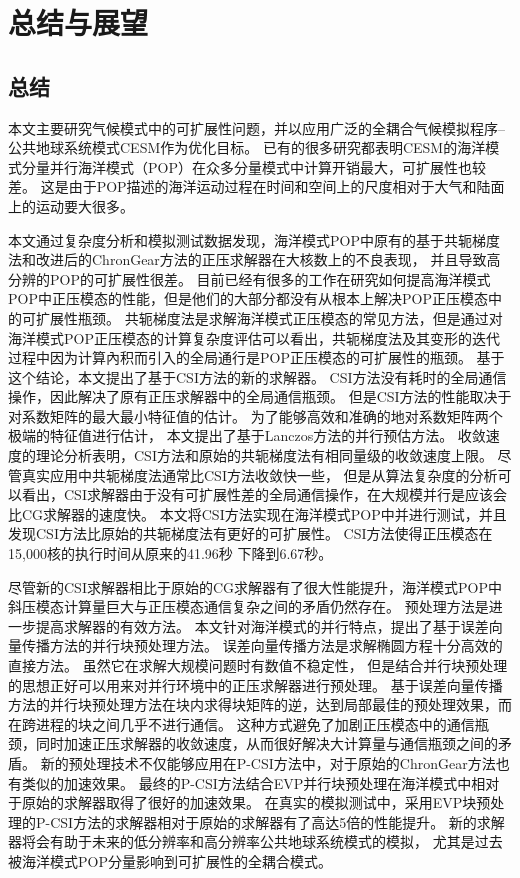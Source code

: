 \chapter{总结与展望}
\label{cha:conclusion}

\section{总结}
\label{sec:conclude}


本文主要研究气候模式中的可扩展性问题，并以应用广泛的全耦合气候模拟程序--公共地球系统模式CESM作为优化目标。
已有的很多研究都表明CESM的海洋模式分量并行海洋模式（POP）在众多分量模式中计算开销最大，可扩展性也较差。 
这是由于POP描述的海洋运动过程在时间和空间上的尺度相对于大气和陆面上的运动要大很多。  


本文通过复杂度分析和模拟测试数据发现，海洋模式POP中原有的基于共轭梯度法和改进后的ChronGear方法的正压求解器在大核数上的不良表现，
并且导致高分辨的POP的可扩展性很差。
目前已经有很多的工作在研究如何提高海洋模式POP中正压模态的性能，但是他们的大部分都没有从根本上解决POP正压模态中的可扩展性瓶颈。 
共轭梯度法是求解海洋模式正压模态的常见方法，但是通过对海洋模式POP正压模态的计算复杂度评估可以看出，共轭梯度法及其变形的迭代过程中因为计算內积而引入的全局通行是POP正压模态的可扩展性的瓶颈。 
基于这个结论，本文提出了基于CSI方法的新的求解器。
CSI方法没有耗时的全局通信操作，因此解决了原有正压求解器中的全局通信瓶颈。 
但是CSI方法的性能取决于对系数矩阵的最大最小特征值的估计。
为了能够高效和准确的地对系数矩阵两个极端的特征值进行估计， 本文提出了基于Lanczos方法的并行预估方法。
收敛速度的理论分析表明，CSI方法和原始的共轭梯度法有相同量级的收敛速度上限。
尽管真实应用中共轭梯度法通常比CSI方法收敛快一些，
但是从算法复杂度的分析可以看出，CSI求解器由于没有可扩展性差的全局通信操作，在大规模并行是应该会比CG求解器的速度快。
本文将CSI方法实现在海洋模式POP中并进行测试，并且发现CSI方法比原始的共轭梯度法有更好的可扩展性。
CSI方法使得正压模态在15,000核的执行时间从原来的41.96秒 下降到6.67秒。    
 
尽管新的CSI求解器相比于原始的CG求解器有了很大性能提升，海洋模式POP中斜压模态计算量巨大与正压模态通信复杂之间的矛盾仍然存在。
预处理方法是进一步提高求解器的有效方法。
本文针对海洋模式的并行特点，提出了基于误差向量传播方法的并行块预处理方法。
误差向量传播方法是求解椭圆方程十分高效的直接方法。
虽然它在求解大规模问题时有数值不稳定性，
但是结合并行块预处理的思想正好可以用来对并行环境中的正压求解器进行预处理。
基于误差向量传播方法的并行块预处理方法在块内求得块矩阵的逆，达到局部最佳的预处理效果，而在跨进程的块之间几乎不进行通信。
这种方式避免了加剧正压模态中的通信瓶颈，同时加速正压求解器的收敛速度，从而很好解决大计算量与通信瓶颈之间的矛盾。
新的预处理技术不仅能够应用在P-CSI方法中，对于原始的ChronGear方法也有类似的加速效果。
最终的P-CSI方法结合EVP并行块预处理在海洋模式中相对于原始的求解器取得了很好的加速效果。
在真实的模拟测试中，采用EVP块预处理的P-CSI方法的求解器相对于原始的求解器有了高达5倍的性能提升。
新的求解器将会有助于未来的低分辨率和高分辨率公共地球系统模式的模拟， 尤其是过去被海洋模式POP分量影响到可扩展性的全耦合模式。 


